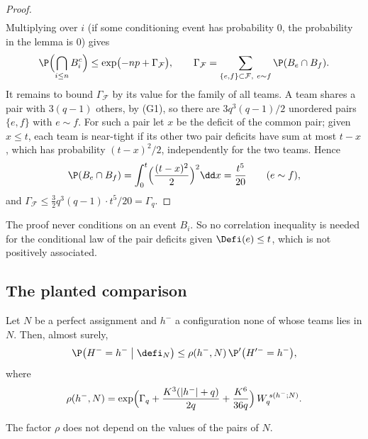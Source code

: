 \begin{proof}
\begin{align*}
\end{align*}
Multiplying over $i$ (if some conditioning event has probability $0$, the probability in the
lemma is $0$) gives
\[
\P\Bigl(\bigcap_{i\le n}B_i^{c}\Bigr)\le\exp\bigl(-np+\Gamma_{\mathcal F}\bigr),\qquad
\Gamma_{\mathcal F}=\sum_{\{e,f\}\subset\mathcal F,\ e\sim f}\P(B_e\cap B_f).
\]
It remains to bound $\Gamma_{\mathcal F}$ by its value for the family of all teams. A team
shares a pair with $3(q-1)$ others, by (G1), so there are $3q^3(q-1)/2$ unordered pairs
$\{e,f\}$ with $e\sim f$. For such a pair let $x$ be the deficit of the common pair; given
$x\le t$, each team is near-tight if its other two pair deficits have sum at most $t-x$, which
has probability $(t-x)^2/2$, independently for the two teams. Hence
\begin{equation}\label{eq:transfer-two}
\P(B_e\cap B_f)=\int_0^t\Bigl(\frac{(t-x)^2}{2}\Bigr)^{2}\dd x=\frac{t^5}{20}\qquad(e\sim f),
\end{equation}
and $\Gamma_{\mathcal F}\le\tfrac32q^3(q-1)\cdot t^5/20=\Gamma_q$.
\end{proof}

The proof never conditions on an event $B_i$. So no correlation inequality is needed for the
conditional law of the pair deficits given $\Defi(e)\le t$, which is not positively associated.

\subsection{The planted comparison}\label{sec:transfer-planted}

\begin{lemma}\label{lem:transfer-planted}
Let $N$ be a perfect assignment and $h^-$ a configuration none of whose teams lies in $N$.
Then, almost surely,
\[
\P\bigl(H^-=h^-\bigm|\defi_N\bigr)\le\rho(h^-,N)\,\P'\bigl(H'^-=h^-\bigr),
\]
where
\[
\rho(h^-,N)=\exp\Bigl(\Gamma_q+\frac{K^3(|h^-|+q)}{2q}+\frac{K^6}{36q}\Bigr)\,W_q^{\,s(h^-;N)} .
\]
\end{lemma}

The factor $\rho$ does not depend on the values of the pairs of $N$.

